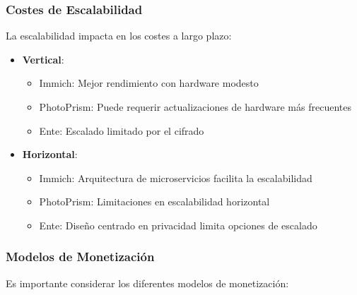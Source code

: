 \subsubsection{Costes de Escalabilidad}

La escalabilidad impacta en los costes a largo plazo:

\begin{itemize}
    \item \textbf{Vertical}:
    \begin{itemize}
        \item Immich: Mejor rendimiento con hardware modesto
        \item PhotoPrism: Puede requerir actualizaciones de hardware más frecuentes
        \item Ente: Escalado limitado por el cifrado
    \end{itemize}
    
    \item \textbf{Horizontal}:
    \begin{itemize}
        \item Immich: Arquitectura de microservicios facilita la escalabilidad
        \item PhotoPrism: Limitaciones en escalabilidad horizontal
        \item Ente: Diseño centrado en privacidad limita opciones de escalado
    \end{itemize}
\end{itemize}

\subsubsection{Modelos de Monetización}

Es importante considerar los diferentes modelos de monetización:

